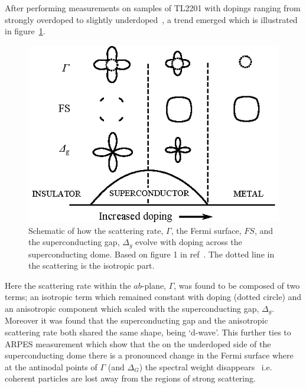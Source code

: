 After performing measurements on samples of \ac{TL2201} with dopings ranging from strongly overdoped to slightly underdoped~\cite{Abdel-Jawad2006}, a trend emerged which is illustrated in figure~\ref{Fig:Intro:AnisotropyPhase}. 
\begin{figure}[htbp]
    \begin{center}
        \includegraphics[scale=0.9]{Chapter-Introduction/Figures/AnisotropyPhase/AnisotropyPhase}
        \caption{Schematic of how the scattering rate, $\Gamma$, the Fermi surface, $FS$, and the superconducting gap, $\Delta_g$ evolve with doping across the superconducting dome. Based on figure 1 in ref~\cite{Taillefer2006}. The dotted line in the scattering is the isotropic part.}
        \label{Fig:Intro:AnisotropyPhase}
    \end{center}
\end{figure}
Here the scattering rate within the $ab$-plane, $\Gamma$, was found to be composed of two terms; an isotropic term which remained constant with doping (dotted circle) and an anisotropic component which scaled with the superconducting gap, $\Delta_g$. Moreover it was found that the superconducting gap and the anisotropic scattering rate both shared the same shape, being `d-wave'. This further ties to \ac{ARPES} measurement which show that the on the underdoped side of the superconducting dome there is a pronounced change in the Fermi surface where at the antinodal points of $\Gamma$ (and $\Delta_G$) the spectral weight disappears~\cite{Norman2010} i.e. coherent particles are lost away from the regions of strong scattering.


